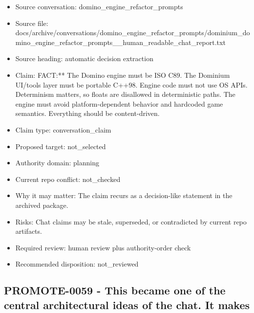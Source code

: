 \documentclass[11pt,a4paper]{report}
\begin{document}
\begin{itemize}
\item Source conversation: domino\_engine\_refactor\_prompts
\item Source file: docs/archive/conversations/domino\_engine\_refactor\_prompts/dominium\_domino\_engine\_refactor\_prompts\_\_human\_readable\_chat\_report.txt
\item Source heading: automatic decision extraction
\item Claim: FACT:** The Domino engine must be ISO C89. The Dominium UI/tools layer must be portable C++98. Engine code must not use OS APIs. Determinism matters, so floats are disallowed in deterministic paths. The engine must avoid platform-dependent behavior and hardcoded game semantics. Everything should be content-driven.
\item Claim type: conversation\_claim
\item Proposed target: not\_selected
\item Authority domain: planning
\item Current repo conflict: not\_checked
\item Why it may matter: The claim recurs as a decision-like statement in the archived package.
\item Risks: Chat claims may be stale, superseded, or contradicted by current repo artifacts.
\item Required review: human review plus authority-order check
\item Recommended disposition: not\_reviewed
\end{itemize}

\subsection{PROMOTE-0059 - This became one of the central architectural ideas of the chat. It makes}
\end{document}
